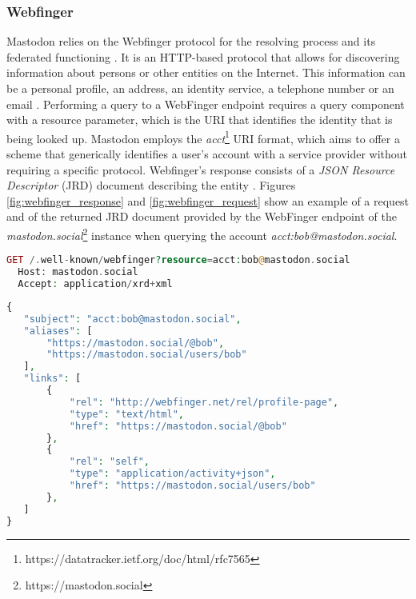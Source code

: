 \subsubsection*{\textbf{Webfinger}}
Mastodon relies on the Webfinger protocol for the resolving process and its federated functioning \cite{rochko_2020}. It is an HTTP-based protocol that allows for discovering information about persons or other entities on the Internet. This information can be a personal profile, an address, an identity service, a telephone number or an email \cite{jones_salgueiro_jones_smarr_2013}. Performing a query to a WebFinger endpoint requires a query component with a resource parameter, which is the URI that identifies the identity that is being looked up. Mastodon employs the \emph{acct}\footnote{https://datatracker.ietf.org/doc/html/rfc7565} URI format, which aims to offer a scheme that generically identifies a user's account with a service provider without requiring a specific protocol. Webfinger's response consists of a \emph{JSON Resource Descriptor} (JRD) document describing the entity \cite{jones_salgueiro_jones_smarr_2013}. Figures \ref{fig:webfinger_response} and \ref{fig:webfinger_request} show an example of a request and of the returned JRD document provided by the WebFinger endpoint of the \emph{mastodon.social}\footnote{https://mastodon.social} instance when querying the account \emph{acct:bob@mastodon.social}.

\lstset{style=JSONStyle}
\begin{lstlisting}[language=PHP, caption=HTTP request to Webfinger endpoint, label=fig:webfinger_request, float=h]
  GET /.well-known/webfinger?resource=acct:bob@mastodon.social
  Host: mastodon.social
  Accept: application/xrd+xml
\end{lstlisting}

\lstset{style=JSONStyle}
\begin{lstlisting}[language=PHP, caption=Webfinger response from mastodon.social, label=fig:webfinger_response, float=h]
{
   "subject": "acct:bob@mastodon.social",
   "aliases": [
       "https://mastodon.social/@bob",
       "https://mastodon.social/users/bob"
   ],
   "links": [
       {
           "rel": "http://webfinger.net/rel/profile-page",
           "type": "text/html",
           "href": "https://mastodon.social/@bob"
       },
       {
           "rel": "self",
           "type": "application/activity+json",
           "href": "https://mastodon.social/users/bob"
       },
   ]
}
\end{lstlisting}

